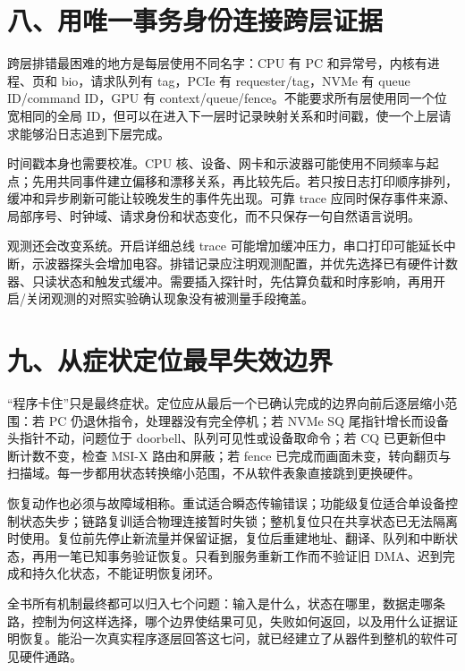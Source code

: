 \section{八、用唯一事务身份连接跨层证据}

跨层排错最困难的地方是每层使用不同名字：CPU 有 PC 和异常号，内核有进程、页和 bio，请求队列有 tag，PCIe 有 requester/tag，NVMe 有 queue ID/command ID，GPU 有 context/queue/fence。不能要求所有层使用同一个位宽相同的全局 ID，但可以在进入下一层时记录映射关系和时间戳，使一个上层请求能够沿日志追到下层完成。

时间戳本身也需要校准。CPU 核、设备、网卡和示波器可能使用不同频率与起点；先用共同事件建立偏移和漂移关系，再比较先后。若只按日志打印顺序排列，缓冲和异步刷新可能让较晚发生的事件先出现。可靠 trace 应同时保存事件来源、局部序号、时钟域、请求身份和状态变化，而不只保存一句自然语言说明。

观测还会改变系统。开启详细总线 trace 可能增加缓冲压力，串口打印可能延长中断，示波器探头会增加电容。排错记录应注明观测配置，并优先选择已有硬件计数器、只读状态和触发式缓冲。需要插入探针时，先估算负载和时序影响，再用开启/关闭观测的对照实验确认现象没有被测量手段掩盖。

\section{九、从症状定位最早失效边界}

“程序卡住”只是最终症状。定位应从最后一个已确认完成的边界向前后逐层缩小范围：若 PC 仍退休指令，处理器没有完全停机；若 NVMe SQ 尾指针增长而设备头指针不动，问题位于 doorbell、队列可见性或设备取命令；若 CQ 已更新但中断计数不变，检查 MSI-X 路由和屏蔽；若 fence 已完成而画面未变，转向翻页与扫描域。每一步都用状态转换缩小范围，不从软件表象直接跳到更换硬件。

恢复动作也必须与故障域相称。重试适合瞬态传输错误；功能级复位适合单设备控制状态失步；链路复训适合物理连接暂时失锁；整机复位只在共享状态已无法隔离时使用。复位前先停止新流量并保留证据，复位后重建地址、翻译、队列和中断状态，再用一笔已知事务验证恢复。只看到服务重新工作而不验证旧 DMA、迟到完成和持久化状态，不能证明恢复闭环。

\begin{keyidea}
全书所有机制最终都可以归入七个问题：输入是什么，状态在哪里，数据走哪条路，控制为何这样选择，哪个边界使结果可见，失败如何返回，以及用什么证据证明恢复。能沿一次真实程序逐层回答这七问，就已经建立了从器件到整机的软件可见硬件通路。
\end{keyidea}
































